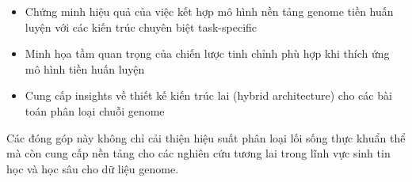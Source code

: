 \begin{itemize}
    \item Chứng minh hiệu quả của việc kết hợp mô hình nền tảng genome tiền huấn luyện với các kiến trúc chuyên biệt task-specific
    \item Minh họa tầm quan trọng của chiến lược tinh chỉnh phù hợp khi thích ứng mô hình tiền huấn luyện
    \item Cung cấp insights về thiết kế kiến trúc lai (hybrid architecture) cho các bài toán phân loại chuỗi genome
\end{itemize}

Các đóng góp này không chỉ cải thiện hiệu suất phân loại lối sống thực khuẩn thể mà còn cung cấp nền tảng cho các nghiên cứu tương lai trong lĩnh vực sinh tin học và học sâu cho dữ liệu genome.
